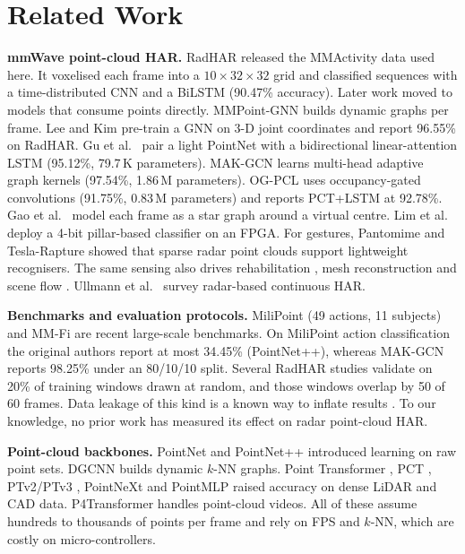 \section{Related Work}
\label{sec:related}

\textbf{mmWave point-cloud HAR.} RadHAR \cite{singh2019radhar} released the
MMActivity data used here. It voxelised each frame into a $10\times32\times32$
grid and classified sequences with a time-distributed CNN and a BiLSTM (90.47\%
accuracy). Later work moved to models that consume points directly.
MMPoint-GNN \cite{gong2021mmpointgnn} builds dynamic graphs per frame. Lee and
Kim \cite{lee2022gnn} pre-train a GNN on 3-D joint coordinates and report
96.55\% on RadHAR. Gu et al.\ \cite{gu2024lpn} pair a light PointNet with a
bidirectional linear-attention LSTM (95.12\%, 79.7\,K parameters).
MAK-GCN \cite{zakka2025makgcn} learns multi-head adaptive graph kernels (97.54\%,
1.86\,M parameters). OG-PCL \cite{yan2025ogpcl} uses occupancy-gated
convolutions (91.75\%, 0.83\,M parameters) and reports PCT+LSTM
\cite{guo2021pct} at 92.78\%. Gao et al.\ \cite{gao2025star} model each frame as
a star graph around a virtual centre. Lim et al.\ \cite{lim2024fpga} deploy a
4-bit pillar-based classifier on an FPGA. For gestures, Pantomime
\cite{palipana2021pantomime} and Tesla-Rapture \cite{salami2023tesla} showed
that sparse radar point clouds support lightweight recognisers. The same sensing
also drives rehabilitation \cite{an2021mars}, mesh reconstruction
\cite{xue2021mmmesh,chen2022mmbody} and scene flow \cite{ding2024milliflow}.
Ullmann et al.\ \cite{ullmann2023survey} survey radar-based continuous HAR.

\textbf{Benchmarks and evaluation protocols.} MiliPoint \cite{cui2023milipoint}
(49 actions, 11 subjects) and MM-Fi \cite{yang2023mmfi} are recent large-scale
benchmarks. On MiliPoint action classification the original authors report at most
34.45\% (PointNet++), whereas MAK-GCN reports 98.25\% under an
80/10/10 split. Several RadHAR studies validate on 20\% of training windows drawn at
random, and those windows overlap by 50 of 60 frames. Data leakage of this kind is a
known way to inflate results \cite{kaufman2012leakage}. To our knowledge, no
prior work has measured its effect on radar point-cloud HAR.

\textbf{Point-cloud backbones.} PointNet \cite{qi2017pointnet} and PointNet++
\cite{qi2017pointnet2} introduced learning on raw point sets. DGCNN
\cite{wang2019dgcnn} builds dynamic $k$-NN graphs. Point Transformer
\cite{zhao2021pt}, PCT \cite{guo2021pct}, PTv2/PTv3 \cite{wu2022ptv2,wu2024ptv3},
PointNeXt \cite{qian2022pointnext} and PointMLP \cite{ma2022pointmlp} raised accuracy
on dense LiDAR and CAD data. P4Transformer \cite{fan2021p4t} handles point-cloud
videos. All of these assume hundreds to thousands of points per frame and rely on
FPS and $k$-NN, which are costly on micro-controllers.

